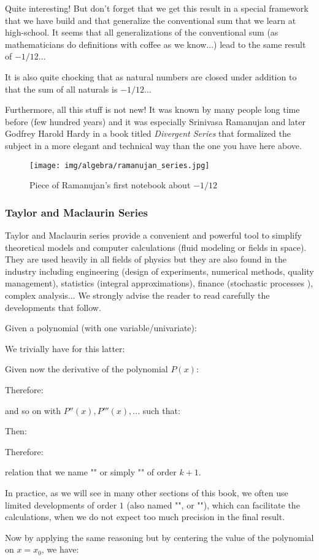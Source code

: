 	Quite interesting! But don't forget that we get this result in a special framework that we have build and that generalize the conventional sum that we learn at high-school. It seems that all generalizations of the conventional sum (as mathematicians do definitions with coffee as we know...) lead to the same result of $-1/12$...
	
	It is also quite chocking that as natural numbers are closed under addition to that the sum of all naturals is $-1/12$...
	
	Furthermore, all this stuff is not new! It was known by many people long time before (few hundred years) and it was especially Srinivasa Ramanujan and later Godfrey Harold Hardy in a book titled \textit{Divergent Series} that formalized the subject in a more elegant and technical way than the one you have here above.
	\begin{figure}[H]
		\centering
		\texttt{[image: img/algebra/ramanujan\_series.jpg]}
		\caption[]{Piece of Ramanujan's first notebook about $-1/12$}
	\end{figure}
	
	\pagebreak
	\subsubsection{Taylor and Maclaurin Series}\label{taylor series}
	Taylor and Maclaurin series provide a convenient and powerful tool to simplify theoretical models and computer calculations (fluid modeling or fields in space). They are used heavily in all fields of physics but they are also found in the industry including engineering (design of experiments, numerical methods, quality management), statistics (integral approximations), finance (stochastic processes ), complex analysis... We strongly advise the reader to read carefully the developments that follow.
	
	Given a polynomial (with one variable/univariate):
	
	We trivially have for this latter:
	
	Given now the derivative of the polynomial $P (x)$:
	
	Therefore:
	
	and so on with $P''(x), P'''(x), ...$ such that:
	
	Then:
	
	Therefore:
	
	relation that we name "" or simply "" of order $k + 1$.
	\begin{tcolorbox}[title=Remark,colframe=black,arc=10pt]
	In practice, as we will see in many other sections of this book, we often use limited developments of order $1$ (also named "", or ""), which can facilitate the calculations, when we do not expect too much precision in the final result.
	\end{tcolorbox}
	Now by applying the same reasoning but by centering the value of the polynomial on $x=x_0$, we have:
	
